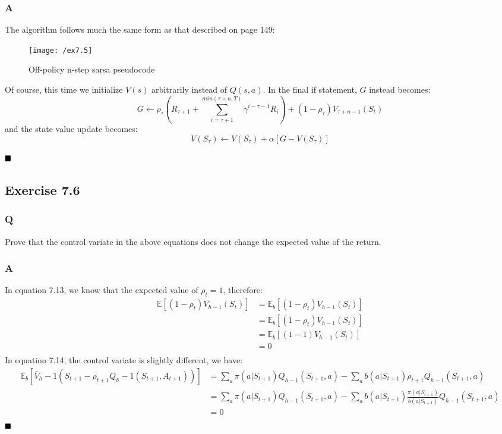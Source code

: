 \subsubsection{A}
The algorithm follows much the same form as that described on page 149:
\begin{figure}[h!]
	\centering
	\texttt{[image: /ex7.5]}
	\caption{Off-policy n-step sarsa pseudocode}
	\label{fig: n-step sarsa methods}
\end{figure}

Of course, this time we initialize $V(s)$ arbitrarily instead of $Q(s,a)$. In the final if statement, $G$ instead becomes:
\begin{equation}
G \leftarrow \rho_\tau \left(R_{\tau+1} + \sum_{i = \tau + 1}^{min(\tau+n, T)} \gamma^{i - \tau -1} R_i\right) + (1 - \rho_\tau)V_{\tau+n-1}(S_t)
\end{equation}
and the state value update becomes:
\begin{equation}
V(S_\tau) \leftarrow V(S_\tau) + \alpha \left[G - V(S_\tau)\right]
\end{equation}

$
\hfill \blacksquare
$

\subsection{Exercise 7.6}
\subsubsection{Q}
Prove that the control variate in the above equations does not change the expected value of the return.
\subsubsection{A}
In equation 7.13, we know that the expected value of $\rho_t =1$, therefore:
\begin{align}
	\mathbb{E}\left[(1-\rho_t) V_{h-1}(S_t)\right] &= \mathbb{E}_b\left[(1-\rho_t) V_{h-1}(S_t)\right] \\
	&= \mathbb{E}_b\left[(1-\rho_t) V_{h-1}(S_t)\right] \\
	&= \mathbb{E}_b\left[(1-1) V_{h-1}(S_t)\right] \\
	&= 0\\
\end{align}
In equation 7.14, the control variate is slightly different, we have:
\begin{align}
	\mathbb{E}_b\left[\bar{V}_h-1(S_{t+1} - \rho_{t+1}Q_h-1(S_{t+1}, A_{t+1}))\right] &= \sum_{a} \pi(a | S_{t+1}) Q_{h-1}(S_{t+1}, a) - \sum_{a}b(a | S_{t+1}) \rho_{t+1} Q_{h-1}(S_{t+1}, a) \\
	&= \sum_{a} \pi(a | S_{t+1}) Q_{h-1}(S_{t+1}, a) - \sum_{a}b(a | S_{t+1}) \frac{\pi(a | S_{t+1})}{b(a | S_{t+1})} Q_{h-1}(S_{t+1}, a) \\
	&= 0 \\
\end{align}
$
\hfill \blacksquare
$

